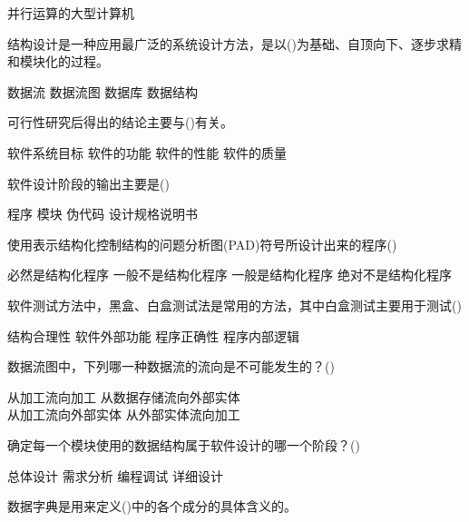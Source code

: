 \documentclass[answers]{exam}
\begin{document}
\begin{questions}
\begin{oneparchoices}
		\choice 并行运算的大型计算机
	\end{oneparchoices}
	\question 结构设计是一种应用最广泛的系统设计方法，是以()为基础、自顶向下、逐步求精和模块化的过程。\\
	\begin{oneparchoices}
		\choice 数据流
		\correctchoice 数据流图
		\choice 数据库
		\choice 数据结构
	\end{oneparchoices}
	\question 可行性研究后得出的结论主要与()有关。\\
	\begin{oneparchoices}
		\correctchoice 软件系统目标
		\choice 软件的功能
		\choice 软件的性能
		\choice 软件的质量
	\end{oneparchoices}
	\question 软件设计阶段的输出主要是()\\
	\begin{oneparchoices}
		\choice 程序
		\choice 模块
		\choice 伪代码
		\correctchoice 设计规格说明书
	\end{oneparchoices}
	\question 使用表示结构化控制结构的问题分析图(PAD)符号所设计出来的程序()\\
	\begin{oneparchoices}
		\correctchoice 必然是结构化程序
		\choice 一般不是结构化程序
		\choice 一般是结构化程序
		\choice 绝对不是结构化程序
	\end{oneparchoices}
	\question 软件测试方法中，黑盒、白盒测试法是常用的方法，其中白盒测试主要用于测试()\\
	\begin{oneparchoices}
		\choice 结构合理性
		\choice 软件外部功能
		\choice 程序正确性
		\correctchoice 程序内部逻辑
	\end{oneparchoices}
	\question 数据流图中，下列哪一种数据流的流向是不可能发生的？()\\
	\begin{oneparchoices}
		\choice 从加工流向加工
		\correctchoice 从数据存储流向外部实体\\
		\choice 从加工流向外部实体
		\choice 从外部实体流向加工
	\end{oneparchoices}
	\question 确定每一个模块使用的数据结构属于软件设计的哪一个阶段？()\\
	\begin{oneparchoices}
		\choice 总体设计
		\choice 需求分析
		\choice 编程调试
		\correctchoice 详细设计
	\end{oneparchoices}
	\question 数据字典是用来定义()中的各个成分的具体含义的。\\
	\begin{oneparchoices}

\end{oneparchoices}
\end{questions}
\end{document}
